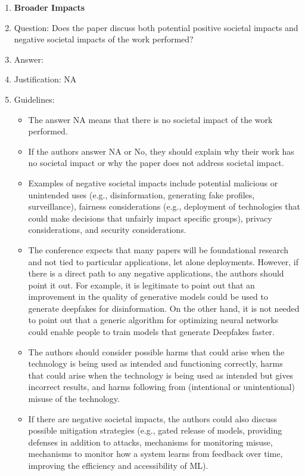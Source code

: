 \documentclass{article}
\begin{document}
\begin{enumerate}
\item {\bf Broader Impacts}
    \item[] Question: Does the paper discuss both potential positive societal impacts and negative societal impacts of the work performed?
    \item[] Answer: \answerNA{} %
    \item[] Justification: NA
    \item[] Guidelines:
    \begin{itemize}
        \item The answer NA means that there is no societal impact of the work performed.
        \item If the authors answer NA or No, they should explain why their work has no societal impact or why the paper does not address societal impact.
        \item Examples of negative societal impacts include potential malicious or unintended uses (e.g., disinformation, generating fake profiles, surveillance), fairness considerations (e.g., deployment of technologies that could make decisions that unfairly impact specific groups), privacy considerations, and security considerations.
        \item The conference expects that many papers will be foundational research and not tied to particular applications, let alone deployments. However, if there is a direct path to any negative applications, the authors should point it out. For example, it is legitimate to point out that an improvement in the quality of generative models could be used to generate deepfakes for disinformation. On the other hand, it is not needed to point out that a generic algorithm for optimizing neural networks could enable people to train models that generate Deepfakes faster.
        \item The authors should consider possible harms that could arise when the technology is being used as intended and functioning correctly, harms that could arise when the technology is being used as intended but gives incorrect results, and harms following from (intentional or unintentional) misuse of the technology.
        \item If there are negative societal impacts, the authors could also discuss possible mitigation strategies (e.g., gated release of models, providing defenses in addition to attacks, mechanisms for monitoring misuse, mechanisms to monitor how a system learns from feedback over time, improving the efficiency and accessibility of ML).
    \end{itemize}
    

\end{enumerate}
\end{document}
